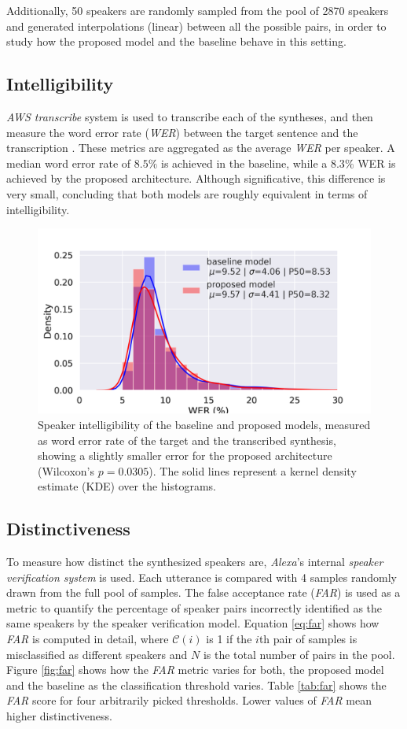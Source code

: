  Additionally, 50 speakers are randomly sampled from the pool of 2870 speakers and generated interpolations (linear) between all the possible pairs, in order to study how the proposed model and the baseline behave in this setting.

 \subsection{Intelligibility}
\textit{AWS transcribe} system is used to transcribe each of the syntheses, and then measure the word error rate (\textit{WER}) between the target sentence and the transcription \autocite{uday2019}. These metrics are aggregated as the average \textit{WER} per speaker. A median word error rate of $8.5\%$ is achieved in the baseline, while a $8.3\%$ WER is achieved by the proposed architecture. Although significative, this difference is very small, concluding that both models are roughly equivalent in terms of intelligibility.


\begin{figure}[h]
	\centering
	\includegraphics[width=0.7\linewidth]{tts/images/wer}
	\caption[Speaker intelligibility curves for the TTS models]{Speaker intelligibility of the baseline and proposed models, measured as word error rate of the target and the transcribed synthesis, showing a slightly smaller error for the proposed architecture (Wilcoxon's $p=0.0305$). The solid lines represent a kernel density estimate (KDE) over the histograms.}
	\label{fig:wer}
\end{figure}


\subsection{Distinctiveness}
To measure how distinct the synthesized speakers are, \textit{Alexa}'s internal \textit{speaker verification system} is used.  Each utterance is compared with 4 samples randomly drawn from the full pool of samples. The false acceptance rate (\textit{FAR}) is used as a metric to quantify the percentage of speaker pairs incorrectly identified as the same speakers by the speaker verification model. Equation \ref{eq:far} shows how \textit{FAR} is computed in detail, where $\mathcal{C}(i)$ is 1 if the $i$th pair of samples is misclassified as different speakers and $N$ is the total number of pairs in the pool. Figure \ref{fig:far} shows how the \textit{FAR} metric varies for both, the proposed model and the baseline as the classification threshold varies. Table \ref{tab:far} shows the \textit{FAR} score for four arbitrarily picked thresholds. Lower values of \textit{FAR} mean higher distinctiveness.


